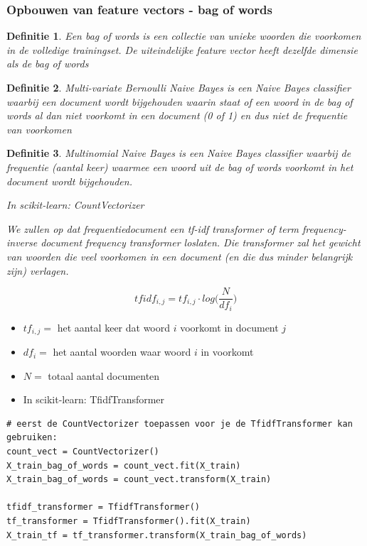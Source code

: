 \documentclass{article}
\newtheorem{theorem}{Definitie}[section]
\begin{document}
\subsubsection{Opbouwen van feature vectors - bag of words}

\begin{theorem}
    Een bag of words is een collectie van unieke woorden die voorkomen in de volledige trainingset. 
    De uiteindelijke feature vector heeft dezelfde dimensie als de bag of words
\end{theorem}

\begin{theorem}
    Multi-variate Bernoulli Naive Bayes is een Naive Bayes classifier waarbij een document wordt bijgehouden
    waarin staat of een woord in de bag of words al dan niet voorkomt in een document (0 of 1) en dus niet de frequentie van voorkomen
\end{theorem}

\begin{theorem}
    Multinomial Naive Bayes is een Naive Bayes classifier waarbij de frequentie (aantal keer) waarmee een woord uit de bag of words voorkomt in het document wordt bijgehouden. 

    In scikit-learn: CountVectorizer

    We zullen op dat frequentiedocument een tf-idf transformer of term frequency-inverse document frequency transformer loslaten.
    Die transformer zal het gewicht van woorden die veel voorkomen in een document (en die dus minder belangrijk zijn) verlagen.
\end{theorem}

\begin{equation*}
    tfidf_{i,j} = tf_{i,j} \cdot log \Big(\frac{N}{df_i}\Big)
\end{equation*}

\begin{itemize}
    \item $tf_{i,j} =$ het aantal keer dat woord $i$ voorkomt in document $j$
    \item $df_i =$ het aantal woorden waar woord $i$ in voorkomt
    \item $N=$ totaal aantal documenten
    \item In scikit-learn: TfidfTransformer
\end{itemize}

\begin{verbatim}
# eerst de CountVectorizer toepassen voor je de TfidfTransformer kan gebruiken:
count_vect = CountVectorizer()
X_train_bag_of_words = count_vect.fit(X_train)
X_train_bag_of_words = count_vect.transform(X_train)

tfidf_transformer = TfidfTransformer()
tf_transformer = TfidfTransformer().fit(X_train)
X_train_tf = tf_transformer.transform(X_train_bag_of_words)
\end{verbatim}
\end{document}
